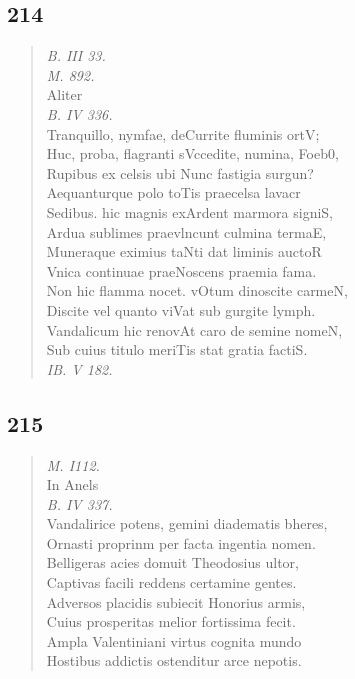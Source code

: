 \documentclass[11pt, a4paper]{report}
\begin{document}
            \subsection*{214}
      \begin{verse}
      \textit{B. III 33.} \\ \textit{M. 892.} \\ Aliter \\ \textit{B. IV 336.} \\ Tranquillo, nymfae, deCurrite fluminis ortV; \\ Huc, proba, flagranti sVccedite, numina, Foeb0, \\ Rupibus ex celsis ubi Nunc fastigia surgun? \\ Aequanturque polo toTis praecelsa lavacr \\ Sedibus. hic magnis exArdent marmora signiS, \\ Ardua sublimes praevlncunt culmina termaE, \\ Muneraque eximius taNti dat liminis auctoR \\ Vnica continuae praeNoscens praemia fama. \\ Non hic flamma nocet. vOtum dinoscite carmeN, \\ Discite vel quanto viVat sub gurgite lymph. \\ Vandalicum hic renovAt caro de semine nomeN, \\ Sub cuius titulo meriTis stat gratia factiS. \\ \textit{IB. V 182.} \\ 
      \end{verse}
  
            \subsection*{215}
      \begin{verse}
      \textit{M. I112.} \\ In Anels \\ \textit{B. IV 337.} \\ Vandalirice potens, gemini diadematis bheres, \\ Ornasti proprinm per facta ingentia nomen. \\ 
        ﻿\pagebreak 
    Belligeras acies domuit Theodosius ultor, \\ Captivas facili reddens certamine gentes. \\ Adversos placidis subiecit Honorius armis, \\ Cuius prosperitas melior fortissima fecit. \\ Ampla Valentiniani virtus cognita mundo \\ Hostibus addictis ostenditur arce nepotis. \\ 
      \end{verse}
  
\end{document}
